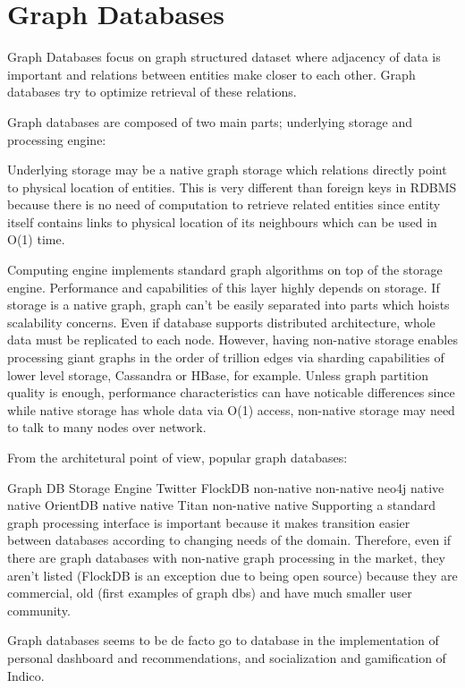 \section{Graph Databases}

Graph Databases focus on graph structured dataset where adjacency of data is important and relations between entities make closer to each other. Graph databases try to optimize retrieval of these relations.

Graph databases are composed of two main parts; underlying storage and processing engine:

Underlying storage may be a native graph storage which relations directly point to physical location of entities. This is very different than foreign keys in RDBMS because there is no need of computation to retrieve related entities since entity itself contains links to physical location of its neighbours which can be used in O(1) time.

Computing engine implements standard graph algorithms on top of the storage engine. Performance and capabilities of this layer highly depends on storage. If storage is a native graph, graph can't be easily separated into parts which hoists scalability concerns. Even if database supports distributed architecture, whole data must be replicated to each node. However, having non-native storage enables processing giant graphs in the order of trillion edges via sharding capabilities of lower level storage, Cassandra or HBase, for example. Unless graph partition quality is enough, performance characteristics can have noticable differences since while native storage has whole data via O(1) access, non-native storage may need to talk to many nodes over network.

From the architetural point of view, popular graph databases:

Graph DB	Storage	Engine
Twitter FlockDB	non-native	non-native
neo4j	native	native
OrientDB	native	native
Titan	non-native	native
Supporting a standard graph processing interface is important because it makes transition easier between databases according to changing needs of the domain. Therefore, even if there are graph databases with non-native graph processing in the market, they aren't listed (FlockDB is an exception due to being open source) because they are commercial, old (first examples of graph dbs) and have much smaller user community.

Graph databases seems to be de facto go to database in the implementation of personal dashboard and recommendations, and socialization and gamification of Indico.

